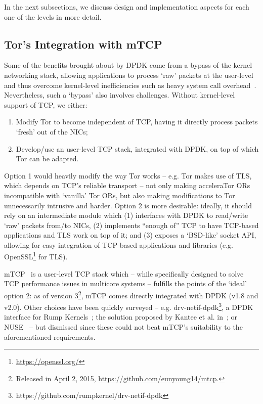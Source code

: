 In the next subsections, we discuss design and implementation aspects for each 
one of the levels in more detail.

\subsection{Tor's Integration with mTCP}
\label{subsec:design-mtcp}

Some of the benefits brought about by DPDK come from a bypass of the kernel 
networking stack, allowing applications to process `raw' packets at the 
user-level and thus overcome kernel-level inefficiencies such as heavy system 
call overhead~\cite{179773, Brouer2014}. Nevertheless, such a `bypass' also 
involves challenges. Without kernel-level support of TCP, we either: 

\begin{enumerate}
	\item Modify Tor to become independent of TCP, having it directly process 
		packets `fresh' out of the NICs;
	\item Develop\slash use an user-level TCP stack, integrated with DPDK, on 
		top of which Tor can be adapted.
\end{enumerate}

Option 1 would heavily modify the way Tor 
works -- e.g. Tor makes use of TLS, which depends on TCP's reliable transport -- not 
only making acceleraTor ORs incompatible with `vanilla' Tor ORs, 
but also making modifications to Tor unnecessarily intrusive and harder. Option 2 is 
more desirable: ideally, it should rely on an intermediate module which (1) interfaces with 
DPDK to read\slash write `raw' packets from\slash to NICs, (2) implements ``enough of'' TCP to 
have TCP-based applications and TLS work on top of it; and (3) exposes a 
`BSD-like' socket API, allowing for easy integration of TCP-based applications 
and libraries (e.g. OpenSSL\footnote{\url{https://openssl.org/}} for TLS).

mTCP~\cite{179773} is a user-level TCP stack which -- while specifically 
designed to solve TCP performance issues in multicore systems -- fulfills the 
points of the `ideal' option 2: as of version 3\footnote{Released in 
April 2, 2015, \url{https://github.com/eunyoung14/mtcp}.}, mTCP comes directly 
integrated with DPDK (v1.8 and v2.0). Other choices have been quickly 
surveyed -- e.g. drv-netif-dpdk\footnote{https://github.com/rumpkernel/drv-netif-dpdk}, a 
DPDK interface for Rump Kernels~\cite{Rump2015}; the solution proposed by Kantee 
et al. in~\cite{Kantee2009}; or NUSE~\cite{Nuse2015} -- but dismissed since these 
could not beat mTCP's suitability to the aforementioned requirements.

